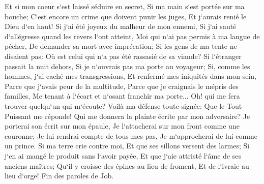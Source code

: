 \verse Et si mon coeur s`est laissé séduire en secret, Si ma main s`est portée sur ma bouche; 
\verse C`est encore un crime que doivent punir les juges, Et j`aurais renié le Dieu d`en haut! 
\verse Si j`ai été joyeux du malheur de mon ennemi, Si j`ai sauté d`allégresse quand les revers l`ont atteint, 
\verse Moi qui n`ai pas permis à ma langue de pécher, De demander sa mort avec imprécation; 
\verse Si les gens de ma tente ne disaient pas: Où est celui qui n`a pas été rassasié de sa viande? 
\verse Si l`étranger passait la nuit dehors, Si je n`ouvrais pas ma porte au voyageur; 
\verse Si, comme les hommes, j`ai caché mes transgressions, Et renfermé mes iniquités dans mon sein, 
\verse Parce que j`avais peur de la multitude, Parce que je craignais le mépris des familles, Me tenant à l`écart et n`osant franchir ma porte... 
\verse Oh! qui me fera trouver quelqu`un qui m`écoute? Voilà ma défense toute signée: Que le Tout Puissant me réponde! Qui me donnera la plainte écrite par mon adversaire? 
\verse Je porterai son écrit sur mon épaule, Je l`attacherai sur mon front comme une couronne; 
\verse Je lui rendrai compte de tous mes pas, Je m`approcherai de lui comme un prince. 
\verse Si ma terre crie contre moi, Et que ses sillons versent des larmes; 
\verse Si j`en ai mangé le produit sans l`avoir payée, Et que j`aie attristé l`âme de ses anciens maîtres; 
\verse Qu`il y croisse des épines au lieu de froment, Et de l`ivraie au lieu d`orge! Fin des paroles de Job. 

